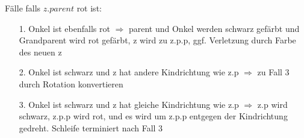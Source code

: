 \documentclass[
    ngerman,
    color=3b,
    dark_mode,
    load_common, %
    summary,
    boxarc,
]{rubos-tuda-template}
\begin{document}
Fälle falls $z.parent$ rot ist:\\
\begin{minipage}{.5\textwidth-1.85301pt}
    \begin{itemize}
        \item[1.] Onkel ist ebenfalls rot $\Rightarrow$ parent und Onkel werden schwarz gefärbt und Grandparent wird rot gefärbt, z wird zu z.p.p, ggf. Verletzung durch Farbe des neuen z
        \item[2.] Onkel ist schwarz und z hat andere Kindrichtung wie z.p $\Rightarrow$ zu Fall 3 durch Rotation konvertieren
        \item[3.] Onkel ist schwarz und z hat gleiche Kindrichtung wie z.p $\Rightarrow$ z.p wird schwarz, z.p.p wird rot, und es wird um z.p.p entgegen der Kindrichtung gedreht. Schleife terminiert nach Fall 3
    \end{itemize}
\end{minipage}
\begin{minipage}{.5\textwidth}
    \begin{tcolorbox}[
            colback=yellow!20,
            colframe=black!70,
            enhanced,
            title={Fall 1},
            fonttitle=\sffamily\bfseries,
            center title,
            every float=\centering
        ]
        \centering
        
    \end{tcolorbox}
\end{minipage}\\
\begin{minipage}[t]{.5\textwidth}\mbox{}
    \begin{tcolorbox}[
            colback=yellow!20,
            colframe=black!70,
            enhanced,
            title={Fall 2},
            fonttitle=\sffamily\bfseries,
            center title,
            every float=\centering
        ]
        \centering
        
    \end{tcolorbox}
\end{minipage}
\begin{minipage}[t]{.5\textwidth-1.85301pt}\mbox{}
    \begin{tcolorbox}[
            colback=yellow!20,
            colframe=black!70,
            enhanced,
            title={Fall 3},
            fonttitle=\sffamily\bfseries,
            center title,
            every float=\centering,
        ]
        \centering
        
    \end{tcolorbox}
\end{minipage}
\end{document}
